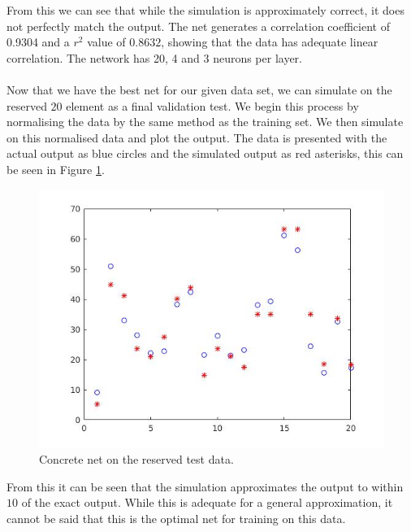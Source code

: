 \documentclass{article}%
\begin{document}
From this we can see that while the simulation is approximately correct, it does not perfectly match the output. The net generates a correlation coefficient of 0.9304 and a $r^2$ value of $0.8632$, showing that the data has adequate linear correlation. The network has 20, 4 and 3 neurons per layer.
\\
\\
Now that we have the best net for our given data set, we can simulate on the reserved $20$ element as a final validation test. We begin this process by normalising the data by the same method as the training set. We then simulate on this normalised data and plot the output. The data is presented with the actual output as blue circles and the simulated output as red asterisks, this can be seen in Figure \ref{fig:contest}.
\begin{figure}[H]
\centering
\includegraphics[scale=0.45]{Images/contest.jpg}
\caption{Concrete net on the reserved test data.}
\label{fig:contest}
\end{figure}
From this it can be seen that the simulation approximates the output to within $10$ of the exact output. While this is adequate for a general approximation, it cannot be said that this is the optimal net for training on this data.
\end{document}
